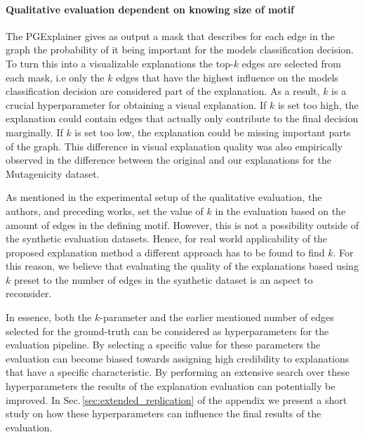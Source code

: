 \paragraph{Qualitative evaluation dependent on knowing size of motif}
The PGExplainer gives as output a mask that describes for each edge in the graph the probability of it being important for the models classification decision. To turn this into a visualizable explanations the top-$k$ edges are selected from each mask, i.e only the $k$ edges that have the highest influence on the models classification decision are considered part of the explanation. As a result, $k$ is a crucial hyperparameter for obtaining a visual explanation. If $k$ is set too high, the explanation could contain edges that actually only contribute to the final decision marginally. If $k$ is set too low, the explanation could be missing important parts of the graph. This difference in visual explanation quality was also empirically observed in the difference between the original and our explanations for the Mutagenicity dataset. 

As mentioned in the experimental setup of the qualitative evaluation, the authors, and preceding works, set the value of $k$ in the evaluation based on the amount of edges in the defining motif. However, this is not a possibility outside of the synthetic evaluation datasets. Hence, for real world applicability of the proposed explanation method a different approach has to be found to find $k$. For this reason, we believe that evaluating the quality of the explanations based using $k$ preset to the number of edges in the synthetic dataset is an aspect to reconsider. 

In essence, both the $k$-parameter and the earlier mentioned number of edges selected for the ground-truth can be considered as hyperparameters for the evaluation pipeline. By selecting a specific value for these parameters the evaluation can become biased towards assigning high credibility to explanations that have a specific characteristic. By performing an extensive search over these hyperparameters the results of the explanation evaluation can potentially be improved. In Sec.\,\ref{sec:extended_replication} of the appendix we present a short study on how these hyperparameters can influence the final results of the evaluation. 